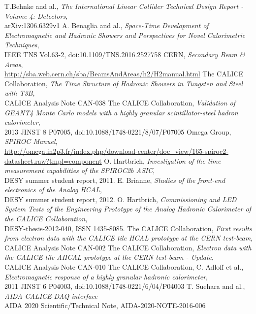 \documentclass[twoside,a4paper,11pt]{article}
\begin{document}
\begin{thebibliography}{10}
T.Behnke and al., \textit{The International Linear Collider Technical Design Report - Volume 4: Detectors}, \\
arXiv:1306.6329v1
	A. Benaglia and al., \textit{Space-Time Development of Electromagnetic and Hadronic Showers and Perspectives for Novel Calorimetric Techniques}, \\
	IEEE TNS Vol.63-2, doi:10.1109/TNS.2016.2527758
	CERN, \textit{Secondary Beam \& Areas}, \\
	\href{http://sba.web.cern.ch/sba/BeamsAndAreas/h2/H2manual.html}{http://sba.web.cern.ch/sba/BeamsAndAreas/h2/H2manual.html}
	The CALICE Collaboration, \textit{The Time Structure of Hadronic Showers in Tungsten and Steel with T3B}, \\
	CALICE Analysis Note CAN-038
	The CALICE Collaboration, \textit{Validation of GEANT4 Monte Carlo models with a highly granular scintillator-steel hadron calorimeter}, \\
	2013 JINST 8 P07005, doi:10.1088/1748-0221/8/07/P07005
	Omega Group, \textit{SPIROC Manuel}, \\
	\href{http://omega.in2p3.fr/index.php/download-center/doc_view/165-spiroc2-datasheet.raw?tmpl=component}{http://omega.in2p3.fr/index.php/download-center/doc\_view/165-spiroc2-datasheet.raw?tmpl=component}
	 O. Hartbrich, \textit{Investigation of the time measurement capabilities of the SPIROC2b ASIC}, \\
	 DESY summer student report, 2011.
	 E. Brianne, \textit{Studies of the front-end electronics of the Analog HCAL}, \\
	 DESY summer student report, 2012.
	 O. Hartbrich, \textit{Commissioning and LED System Tests of the Engineering Prototype of the Analog Hadronic Calorimeter of the CALICE Collaboration}, \\
	 DESY-thesis-2012-040, ISSN 1435-8085.
	 The CALICE Collaboration, \textit{First results from electron data with the CALICE tile HCAL prototype at the CERN test-beam}, \\
	 CALICE Analysis Note CAN-002
	 The CALICE Collaboration, \textit{Electron data with the CALICE tile AHCAL prototype at the CERN test-beam - Update}, \\
	 CALICE Analysis Note CAN-010
	 The CALICE Collaboration, C. Adloff et al., \textit{Electromagnetic response of a highly granular hadronic calorimeter}, \\
	 2011 JINST 6 P04003, doi:10.1088/1748-0221/6/04/P04003
	 T. Suehara and al., \textit{AIDA-CALICE DAQ interface} \\
	 AIDA 2020 Scientific/Technical Note, AIDA-2020-NOTE-2016-006
\end{thebibliography}
\end{document}
